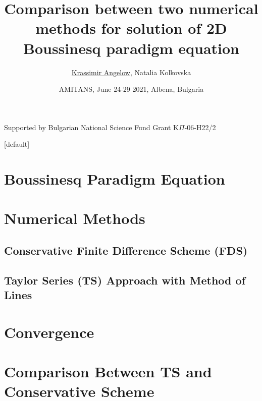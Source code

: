 \documentclass{beamer}
\begin{document}
\title{Comparison between two numerical methods for solution of 2D Boussinesq paradigm equation}

\author[angelow@math.bas.bg]{{\underline{Krassimir Angelow}}, Natalia Kolkovska}
\date[2021]{AMITANS, June 24-29  2021,  Albena, Bulgaria}


\begin{frame}
 \titlepage
 \begin{center}
  Supported by Bulgarian National Science Fund Grant K$\Pi$-06-H22/2
  \end{center}
\end{frame}

\begin{frame}
\tableofcontents 
{}[default]
\section{Boussinesq Paradigm Equation}
\section{Numerical Methods}
\subsection{Conservative Finite Difference Scheme (FDS) }
\subsection{Taylor Series (TS) Approach with Method of Lines }


\section{Convergence}

\section{Comparison Between TS and Conservative Scheme}
\end{frame}
\end{document}
